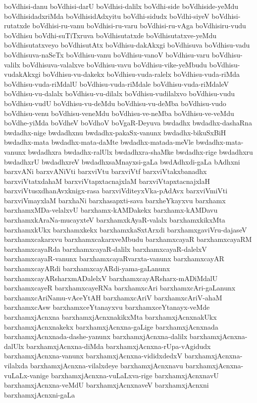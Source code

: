 {boVdhisi-danu
boVdhisi-darU
boVdhisi-dalilx
boVdhi-side
boVdhiside-yeMdu
boVdhisidadxriMda
boVdhisidAdxyitu
boVdhi-sidudx
boVdhi-siyeV
boVdhisi-rutatxde
boVdhisi-ru-vanu
boVdhisi-ru-varu
boVdhisi-ru-vAga
boVdhisiru-vudu
boVdhisu
boVdhi-suTiTxruva
boVdhisutatxde
boVdhisutatxve-yeMdu
boVdhisutatxveyo
boVdhisutAtx
boVdhisu-dakAkxgi
boVdhisuva
boVdhisu-vadu
boVdhisuva-naSeTx
boVdhisu-vanu
boVdhisu-vanoV
boVdhisu-varu
boVdhisu-valilx
boVdhisuva-valalxve
boVdhisu-vavu
boVdhisu-vike-yeMbudu
boVdhisu-vudakAkxgi
boVdhisu-vu-dakekx
boVdhisu-vuda-ralelx
boVdhisu-vuda-riMda
boVdhisu-vuda-riMdalU
boVdhisu-vuda-riMdale
boVdhisu-vuda-riMdaleV
boVdhisu-vu-dalalx
boVdhisu-vu-dilalx
boVdhisu-vudilalxvo
boVdhisu-vudu
boVdhisu-vudU
boVdhisu-vu-deMdu
boVdhisu-vu-deMba
boVdhisu-vudo
boVdhisu-venu
boVdhisu-veneMdu
boVdhisu-ve-neMba
boVdhisu-ve-veMdu
boVdhe-yiMda
boVdheV
boVdhoV
boVgaR-Deyuva
bwdadhx
bwdadhx-dashaRna
bwdadhx-nige
bwdadhxnu
bwdadhx-pakaSx-vanunx
bwdadhx-bikuSxBiH
bwdadhx-mata
bwdadhx-mata-daMte
bwdadhx-matada-meVle
bwdadhx-mata-vanunx
bwdadhxra
bwdadhx-ralUlx
bwdadhxra-shaMke
bwdadhx-rige
bwdadhxru
bwdadhxrU
bwdadhxreV
bwdadhxsaMnayxsi-gaLa
bwdAdhxdi-gaLa
bAdhxni
barxvANi
barxvANiVti
barxviVtu
barxviVtf
barxviVtakxbanadhx
barxviVtatxdahaM
barxviVtapxtacnajxlaM
barxviVtapxtacnajxlaH
barxviVtusxdhanAvxknigx-rasa
barxviVditeyxVka-pAdAvx
barxviVmiVti
barxviVmayxlaM
barxhaNi
barxhasapxti-sava
barxheYkayxvu
barxhamx
barxhamxMDa-velalxvU
barxhamx-kAMDakekx
barxhamx-kAMDavu
barxhamxkAraNa-mucayxteV
barxhamxkAyaR-valalx
barxhamxkikxMta
barxhamxkUkx
barxhamxkekx
barxhamxkaSxtArxdi
barxhamxgaviVru-dajaseV
barxhamxcakarxvu
barxhamxcakarxveMbudu
barxhamxcayaR
barxhamxcayaRM
barxhamxcayaRda
barxhamxcayaR-dalilx
barxhamxcayaR-dalelxV
barxhamxcayaR-vanunx
barxhamxcayaRvarxta-vanunx
barxhamxcayAR
barxhamxcayARdi
barxhamxcayARdi-yama-gaLanunx
barxhamxcayARsharxmADalelxV
barxhamxcayARsharx-mADiMdalU
barxhamxcayeR
barxhamxcayeRNa
barxhamxcAri
barxhamxcAri-gaLanunx
barxhamxcAriNamu-vAceYtAH
barxhamxcAriV
barxhamxcAriV-ahaM
barxhamxcAsw
barxhamxceYtanayxvu
barxhamxceYtanayx-veMde
barxhamxjAcnxna
barxhamxjAcnxnakikxMta
barxhamxjAcnxnakUkx
barxhamxjAcnxnakekx
barxhamxjAcnxna-gaLige
barxhamxjAcnxnada
barxhamxjAcnxnada-dashe-yanunx
barxhamxjAcnxna-dalilx
barxhamxjAcnxna-dalUlx
barxhamxjAcnxna-diMda
barxhamxjAcnxna-rUpa-vAgidudx
barxhamxjAcnxna-vanunx
barxhamxjAcnxna-vididxdedxV
barxhamxjAcnxna-vilalxda
barxhamxjAcnxna-vilalxdeye
barxhamxjAcnxnavu
barxhamxjAcnxna-vuLaLx-vanige
barxhamxjAcnxna-vuLaLxva-rige
barxhamxjAcnxnavU
barxhamxjAcnxna-veMdU
barxhamxjAcnxnaveV
barxhamxjAcnxni
barxhamxjAcnxni-gaLa
}
